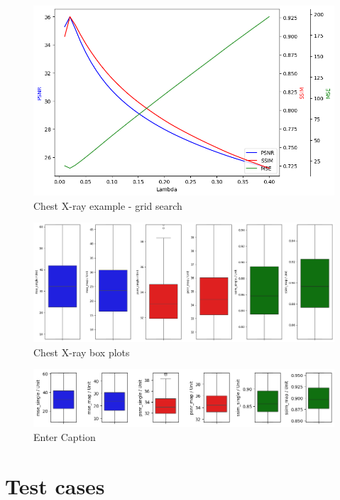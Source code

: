 \documentclass[12pt]{article}
\begin{document}
\begin{figure}[h]
    \centering
    \includegraphics[width=0.6\linewidth]{images//chest_xray/chest_xray-line_plots.png}
        \caption{Chest X-ray example - grid search}
    \label{fig:enter-label}
\end{figure}

\begin{figure}[h]
    \centering
        \includegraphics[width=1\linewidth]{images//chest_xray/outputa.png}
        \caption{Chest X-ray box plots}
    \label{fig:enter-label}
\end{figure}

\begin{figure}
    \centering
    \includegraphics[width=0.5\linewidth]{images//chest_xray/output3.png}
    \caption{Enter Caption}
    \label{fig:enter-label}
\end{figure}

\section{Test cases}
\end{document}
